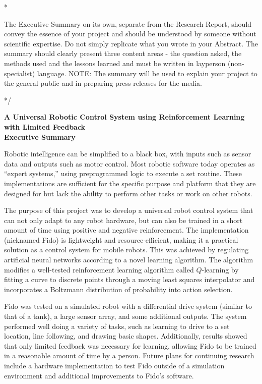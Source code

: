 \documentclass[letterpaper,12pt]{article}
\begin{document}
\/*

The Executive Summary on its own, separate from the Research Report, should convey the essence of your project and should be understood by someone without scientific expertise. Do not simply replicate what you wrote in your Abstract. The summary should clearly present three content areas - the question asked, the methods used and the lessons learned and must be written in layperson (non-specialist) language. NOTE: The summary will be used to explain your project to the general public and in preparing press releases for the media.

*/

\begin{center}
	{\Large
	\textbf{A Universal Robotic Control System using Reinforcement Learning with Limited Feedback}}\\
	\vspace{1cm}
	{\large \textbf{Executive Summary}}
\end{center}

\noindent

Robotic intelligence can be simplified to a black box, with inputs such as sensor data and outputs such as motor control.  Most robotic software today operates as ``expert systems,'' using preprogrammed logic to execute a set routine.  These implementations are sufficient for the specific purpose and platform that they are designed for but lack the ability to perform other tasks or work on other robots.

The purpose of this project was to develop a universal robot control system that can not only adapt to any robot hardware, but can also be trained in a short amount of time using positive and negative reinforcement.  The implementation (nicknamed Fido) is lightweight and resource-efficient, making it a practical solution as a control system for mobile robots.  This was achieved by regulating artificial neural networks according to a novel learning algorithm.  The algorithm modifies a well-tested reinforcement learning algorithm called $Q$-learning by fitting a curve to discrete points through a moving least squares interpolator and incorporates a Boltzmann distribution of probability into action selection.

Fido was tested on a simulated robot with a differential drive system (similar to that of a tank), a large sensor array, and some additional outputs.  The system performed well doing a variety of tasks, such as learning to drive to a set location, line following, and drawing basic shapes.  Additionally, results showed that only limited feedback was necessary for learning, allowing Fido to be trained in a reasonable amount of time by a person.  Future plans for continuing research include a hardware implementation to test Fido outside of a simulation environment and additional improvements to Fido's software.
\end{document}
